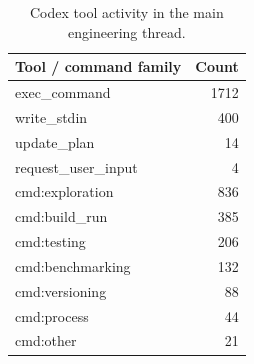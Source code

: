 \begin{table}[t]
\centering
\caption{Codex tool activity in the main engineering thread.}
\label{tab:codex-tools}
\small
\begin{tabular}{@{}lr@{}}
\toprule
\textbf{Tool / command family} & \textbf{Count} \\
\midrule
exec\_command & 1712 \\
write\_stdin & 400 \\
update\_plan & 14 \\
request\_user\_input & 4 \\
\midrule
cmd:exploration & 836 \\
cmd:build\_run & 385 \\
cmd:testing & 206 \\
cmd:benchmarking & 132 \\
cmd:versioning & 88 \\
cmd:process & 44 \\
cmd:other & 21 \\
\bottomrule
\end{tabular}
\end{table}
